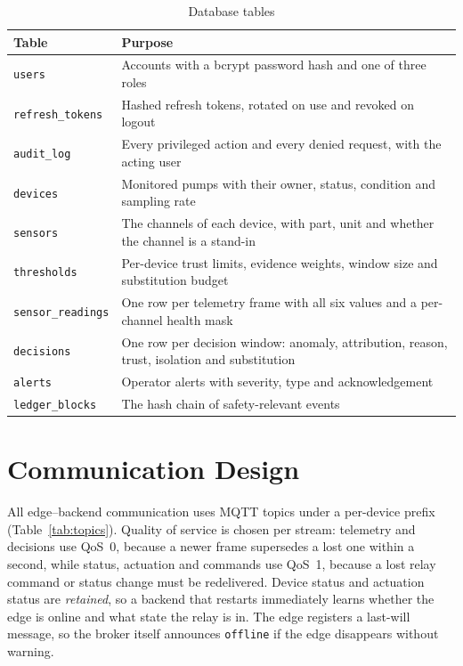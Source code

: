 \begin{table}[htbp]
\centering
\caption{Database tables}
\label{tab:tables}
\small
\begin{tabularx}{\textwidth}{@{}P{3.6cm} X@{}}
\toprule
\textbf{Table} & \textbf{Purpose} \\
\midrule
\texttt{users} & Accounts with a bcrypt password hash and one of three roles \\
\texttt{refresh\_tokens} & Hashed refresh tokens, rotated on use and revoked on logout \\
\texttt{audit\_log} & Every privileged action and every denied request, with the acting user \\
\texttt{devices} & Monitored pumps with their owner, status, condition and sampling rate \\
\texttt{sensors} & The channels of each device, with part, unit and whether the channel is a stand-in \\
\texttt{thresholds} & Per-device trust limits, evidence weights, window size and substitution budget \\
\texttt{sensor\_readings} & One row per telemetry frame with all six values and a per-channel health mask \\
\texttt{decisions} & One row per decision window: anomaly, attribution, reason, trust, isolation and substitution \\
\texttt{alerts} & Operator alerts with severity, type and acknowledgement \\
\texttt{ledger\_blocks} & The hash chain of safety-relevant events \\
\bottomrule
\end{tabularx}
\end{table}

\section{Communication Design}

All edge--backend communication uses MQTT topics under a per-device prefix (Table~\ref{tab:topics}). Quality of service is chosen per stream: telemetry and decisions use QoS~0, because a newer frame supersedes a lost one within a second, while status, actuation and commands use QoS~1, because a lost relay command or status change must be redelivered. Device status and actuation status are \emph{retained}, so a backend that restarts immediately learns whether the edge is online and what state the relay is in. The edge registers a last-will message, so the broker itself announces \texttt{offline} if the edge disappears without warning.

